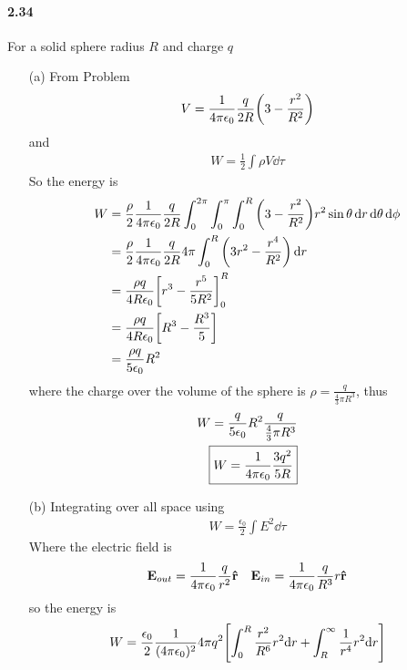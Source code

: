 \documentclass[../main.tex]{subfiles}
\begin{document}
\paragraph{2.34} For a solid sphere radius $R$ and charge $q$
\begin{itemize}
    \item [(a)] From Problem 
    \begin{align*}
        V = \ke \frac{q}{2R} \qt(3 - \frac{r^2}{R^2}) 
    \end{align*} and
    \begin{align*} \tag{2.43} \label{eq:2_43}
        W = \frac{1}{2} \int \rho V \dd{\tau}
    \end{align*}
    So the energy is 
    \begin{align*}
        W &= \frac{\rho}{2} \ke \frac{q}{2R} \int_0^{2\pi}\int_0^\pi\int_0^R \qt(3 - \frac{r^2}{R^2}) r^2 \sin\theta \dd{r} \dd{\theta} \dd{\phi} \\
        &= \frac{\rho}{2} \ke \frac{q}{2R} 4\pi \int_0^R \qt(3r^2 - \frac{r^4}{R^2}) \dd{r} \\
        &= \frac{\rho q}{4R\epsilon_0} \qt[r^3 - \frac{r^5}{5R^2}]_0^R \\
        &= \frac{\rho q}{4R\epsilon_0} \qt[R^3 - \frac{R^3}{5}] \\
        &= \frac{\rho q}{5\epsilon_0} R^2
    \end{align*}
    where the charge over the volume of the sphere is $\rho = \frac{q}{\frac{4}{3}\pi R^3}$, thus
    \begin{align*}
        W = \frac{q}{5\epsilon_0} R^2 \frac{q}{\frac{4}{3}\pi R^3} \\
        \boxed{W = \frac{1}{4\pi\epsilon_0} \frac{3q^2}{5R}}
    \end{align*}
    \item[(b)] Integrating over all space using 
    \begin{align*}\tag{2.45} \label{eq:2_45}
        W = \frac{\epsilon_0}{2} \int E^2 \dd{\tau}
    \end{align*}
    Where the electric field is
    \begin{align*}
        \vb{E}_{out} = \frac{1}{4\pi\epsilon_0} \frac{q}{r^2} \vu{r} \quad \vb{E}_{in} = \frac{1}{4\pi\epsilon_0} \frac{q}{R^3} r \vu{r}
    \end{align*}
    so the energy is
    \begin{align*}
        W &= \frac{\epsilon_0}{2} \frac{1}{(4\pi\epsilon_0)^2} 4\pi q^2 \qt[\int_0^R \frac{r^2}{R^6} r^2 \dd r + \int_R^\infty \frac{1}{r^4} r^2 \dd r] \\

\end{align*}
\end{itemize}
\end{document}
